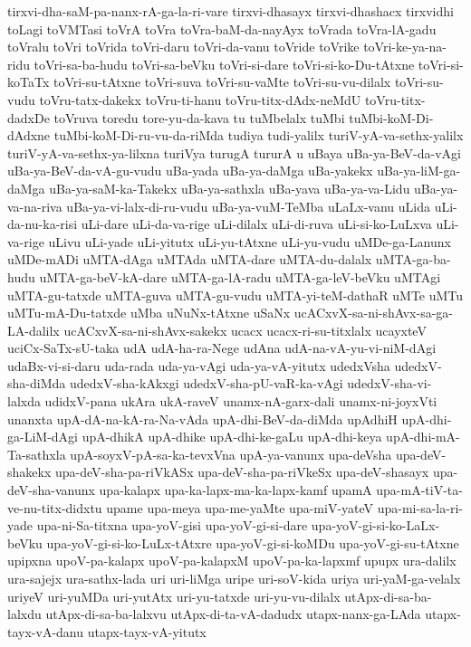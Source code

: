 {tirxvi-dha-saM-pa-nanx-rA-ga-la-ri-vare
tirxvi-dhasayx
tirxvi-dhashacx
tirxvidhi
toLagi
toVMTasi
toVrA
toVra
toVra-baM-da-nayAyx
toVrada
toVra-lA-gadu
toVralu
toVri
toVrida
toVri-daru
toVri-da-vanu
toVride
toVrike
toVri-ke-ya-na-ridu
toVri-sa-ba-hudu
toVri-sa-beVku
toVri-si-dare
toVri-si-ko-Du-tAtxne
toVri-si-koTaTx
toVri-su-tAtxne
toVri-suva
toVri-su-vaMte
toVri-su-vu-dilalx
toVri-su-vudu
toVru-tatx-dakekx
toVru-ti-hanu
toVru-titx-dAdx-neMdU
toVru-titx-dadxDe
toVruva
toredu
tore-yu-da-kava
tu
tuMbelalx
tuMbi
tuMbi-koM-Di-dAdxne
tuMbi-koM-Di-ru-vu-da-riMda
tudiya
tudi-yalilx
turiV-yA-va-sethx-yalilx
turiV-yA-va-sethx-ya-lilxna
turiVya
turugA
tururA
u
uBaya
uBa-ya-BeV-da-vAgi
uBa-ya-BeV-da-vA-gu-vudu
uBa-yada
uBa-ya-daMga
uBa-yakekx
uBa-ya-liM-ga-daMga
uBa-ya-saM-ka-Takekx
uBa-ya-sathxla
uBa-yava
uBa-ya-va-Lidu
uBa-ya-va-na-riva
uBa-ya-vi-lalx-di-ru-vudu
uBa-ya-vuM-TeMba
uLaLx-vanu
uLida
uLi-da-nu-ka-risi
uLi-dare
uLi-da-va-rige
uLi-dilalx
uLi-di-ruva
uLi-si-ko-LuLxva
uLi-va-rige
uLivu
uLi-yade
uLi-yitutx
uLi-yu-tAtxne
uLi-yu-vudu
uMDe-ga-Lanunx
uMDe-mADi
uMTA-dAga
uMTAda
uMTA-dare
uMTA-du-dalalx
uMTA-ga-ba-hudu
uMTA-ga-beV-kA-dare
uMTA-ga-lA-radu
uMTA-ga-leV-beVku
uMTAgi
uMTA-gu-tatxde
uMTA-guva
uMTA-gu-vudu
uMTA-yi-teM-dathaR
uMTe
uMTu
uMTu-mA-Du-tatxde
uMba
uNuNx-tAtxne
uSaNx
ucACxvX-sa-ni-shAvx-sa-ga-LA-dalilx
ucACxvX-sa-ni-shAvx-sakekx
ucacx
ucacx-ri-su-titxlalx
ucayxteV
uciCx-SaTx-sU-taka
udA
udA-ha-ra-Nege
udAna
udA-na-vA-yu-vi-niM-dAgi
udaBx-vi-si-daru
uda-rada
uda-ya-vAgi
uda-ya-vA-yitutx
udedxVsha
udedxV-sha-diMda
udedxV-sha-kAkxgi
udedxV-sha-pU-vaR-ka-vAgi
udedxV-sha-vi-lalxda
udidxV-pana
ukAra
ukA-raveV
unamx-nA-garx-dali
unamx-ni-joyxVti
unanxta
upA-dA-na-kA-ra-Na-vAda
upA-dhi-BeV-da-diMda
upAdhiH
upA-dhi-ga-LiM-dAgi
upA-dhikA
upA-dhike
upA-dhi-ke-gaLu
upA-dhi-keya
upA-dhi-mA-Ta-sathxla
upA-soyxV-pA-sa-ka-tevxVna
upA-ya-vanunx
upa-deVsha
upa-deV-shakekx
upa-deV-sha-pa-riVkASx
upa-deV-sha-pa-riVkeSx
upa-deV-shasayx
upa-deV-sha-vanunx
upa-kalapx
upa-ka-lapx-ma-ka-lapx-kamf
upamA
upa-mA-tiV-ta-ve-nu-titx-didxtu
upame
upa-meya
upa-me-yaMte
upa-miV-yateV
upa-mi-sa-la-ri-yade
upa-ni-Sa-titxna
upa-yoV-gisi
upa-yoV-gi-si-dare
upa-yoV-gi-si-ko-LaLx-beVku
upa-yoV-gi-si-ko-LuLx-tAtxre
upa-yoV-gi-si-koMDu
upa-yoV-gi-su-tAtxne
upipxna
upoV-pa-kalapx
upoV-pa-kalapxM
upoV-pa-ka-lapxmf
upupx
ura-dalilx
ura-sajejx
ura-sathx-lada
uri
uri-liMga
uripe
uri-soV-kida
uriya
uri-yaM-ga-velalx
uriyeV
uri-yuMDa
uri-yutAtx
uri-yu-tatxde
uri-yu-vu-dilalx
utApx-di-sa-ba-lalxdu
utApx-di-sa-ba-lalxvu
utApx-di-ta-vA-dadudx
utapx-nanx-ga-LAda
utapx-tayx-vA-danu
utapx-tayx-vA-yitutx
}
